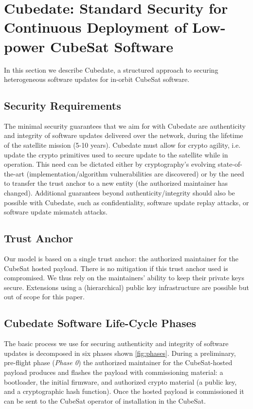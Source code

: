 \section{Cubedate: Standard Security for Continuous Deployment of Low-power CubeSat Software}
\label{sec:low-power-orbital-communication-arch}

In this section we describe Cubedate, a structured approach to securing heterogeneous software updates
for in-orbit CubeSat software.

\subsection{Security Requirements}
The minimal security guarantees that we aim for with Cubedate are authenticity and integrity of software
updates delivered over the network, during the lifetime of the satellite mission (5-10 years).
Cubedate must allow for crypto agility, i.e. update the crypto primitives used to secure update to the
satellite while in operation. This need can be dictated either by cryptography's evolving state-of-the-art
(implementation/algorithm vulnerabilities are discovered) or by the need to transfer the trust anchor
to a new entity (the authorized maintainer has changed). Additional guarantees beyond authenticity/integrity
should also be possible with Cubedate, such as confidentiality, software update replay attacks, or software update mismatch attacks.

\subsection{Trust Anchor}
Our model is based on a single trust anchor: the authorized maintainer for the CubeSat hosted payload.
There is no mitigation if this trust anchor used is compromised. We thus rely on the maintainers' ability
to keep their private keys secure.  Extensions using a (hierarchical) public key infrastructure are possible
but out of scope for this paper.

\subsection{Cubedate Software Life-Cycle Phases}
The basic process we use for securing authenticity and integrity of software updates is decomposed in six phases
shown \autoref{fig:phases}. During a preliminary, pre-flight phase (\textit{Phase 0}) the authorized maintainer
for the CubeSat-hosted payload produces and flashes the payload with commissioning material:
a bootloader, the initial firmware, and authorized crypto material (a public key, and a cryptographic hash function).
Once the hosted payload is commissioned it can be sent to the CubeSat operator of installation in the CubeSat.

